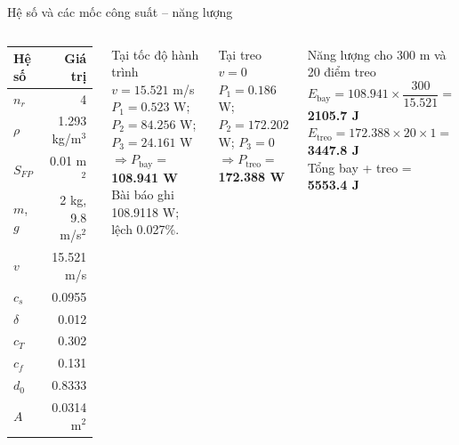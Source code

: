 \documentclass[t,aspectratio=169]{beamer}
\newcommand{\hr}[1]{{\color{hred}\textbf{#1}}}
\begin{document}
\begin{frame}{Hệ số và các mốc công suất -- năng lượng}
  \begin{columns}[T]
  \centering\scriptsize
  \setlength{\tabcolsep}{4pt}
  \begin{tabular}{@{}l r@{}}
    \toprule
    \textbf{Hệ số} & \textbf{Giá trị}\\
    \midrule
    $n_r$ & 4\\
    $\rho$ & 1.293 kg/m$^3$\\
    $S_{FP}$ & 0.01 m$^2$\\
    $m$, $g$ & 2 kg, 9.8 m/s$^2$\\
    $v$ & 15.521 m/s\\
    $c_s$ & 0.0955\\
    $\delta$ & 0.012\\
    $c_T$ & 0.302\\
    $c_f$ & 0.131\\
    $d_0$ & 0.8333\\
    $A$ & 0.0314 m$^2$\\
    \bottomrule
  \end{tabular}
  \begin{block}{Tại tốc độ hành trình $v=15.521$ m/s}\scriptsize
  $P_1=0.523$ W; $P_2=84.256$ W; $P_3=24.161$ W\\
  $\Rightarrow P_{\mathrm{bay}}=$ \hr{108.941 W}\\
  Bài báo ghi 108.9118 W; lệch 0.027\%.
  \end{block}
  \begin{block}{Tại treo $v=0$}\scriptsize
  $P_1=0.186$ W; $P_2=172.202$ W; $P_3=0$\\
  $\Rightarrow P_{\mathrm{treo}}=$ \hr{172.388 W}
  \end{block}
  \begin{exampleblock}{Năng lượng cho 300 m và 20 điểm treo}\scriptsize
  $E_{\mathrm{bay}}=108.941\times\dfrac{300}{15.521}=$ \hr{2105.7 J}\\
  $E_{\mathrm{treo}}=172.388\times20\times1=$ \hr{3447.8 J}\\
  Tổng bay + treo = \hr{5553.4 J}
  \end{exampleblock}
  \end{columns}
\end{frame}
\end{document}
